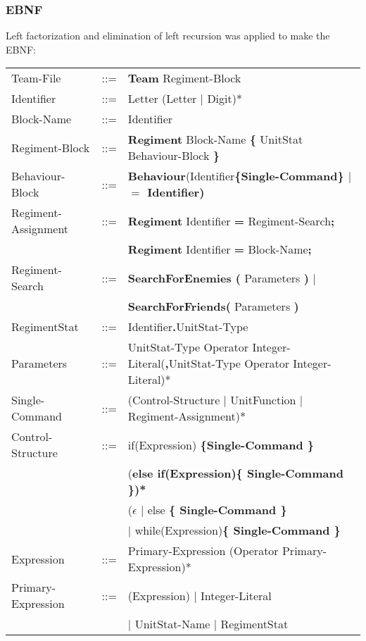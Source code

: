	\subsubsection{EBNF}
		Left factorization and elimination of left recursion was applied to make the EBNF: \\
		\begin{center}
			\begin{longtable}{ l l l }
				\endfirsthead
				\endhead
				Team-File			&	::=	&{\bf Team} Regiment-Block \\
				Identifier			&	::=	&Letter (Letter $\mid$ Digit)*\\
				Block-Name			&	::=	&Identifier							\\
				Regiment-Block		&	::=	&{\bf Regiment} Block-Name {\bf \{ } UnitStat Behaviour-Block \bf{\} }\\
				Behaviour-Block		&	::=	&{\bf Behaviour}(Identifier\bf{\{}Single-Command\bf{\}} $\mid$ {\bf $=$} Identifier)\\
				Regiment-Assignment	&	::=	&{\bf Regiment} Identifier {\bf =} Regiment-Search{\bf ;}\\
									&		&{\bf Regiment} Identifier {\bf =} Block-Name{\bf ;}\\
				Regiment-Search		&	::=	&{\bf SearchForEnemies (} Parameters {\bf )} $\mid$\\
									&		&{\bf SearchForFriends(} Parameters {\bf )}	 \\
				RegimentStat		&	::=	&Identifier{\bf.}UnitStat-Type \\
				Parameters			&	::=	&UnitStat-Type Operator Integer-Literal({\bf ,}UnitStat-Type Operator Integer-Literal)*\\
				Single-Command		&	::=	&(Control-Structure $\mid$ UnitFunction $\mid$ Regiment-Assignment)*\\		
				Control-Structure	&	::=	&if(Expression) \bf{\{}Single-Command \bf{\}}\\
									&		&(\bf{else if(}Expression\bf{)\{ }Single-Command\bf{ \}})* \\
									&		&($\epsilon$ $\mid$ else \bf{\{ }Single-Command \bf{\} }\\					   
									&		&$\mid$ while(Expression)\bf{\{ } Single-Command \bf{\}}\\
				Expression			&	::=	&Primary-Expression (Operator Primary-Expression)*\\
				Primary-Expression	&	::=	&(Expression) $\mid$ Integer-Literal \\
									&		&$\mid$ UnitStat-Name $\mid$ RegimentStat \\	

\end{longtable}
\end{center}
